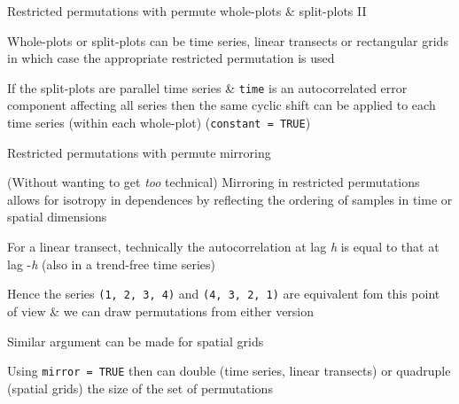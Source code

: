 \documentclass[10pt,ignorenonframetext,compress, aspectratio=169]{beamer}
\begin{document}
\begin{frame}{Restricted permutations with permute \textbar{}
whole-plots \& split-plots II}

Whole-plots or split-plots can be time series, linear transects or
rectangular grids in which case the appropriate restricted permutation
is used

If the split-plots are parallel time series \& \texttt{time} is an
autocorrelated error component affecting all series then the same cyclic
shift can be applied to each time series (within each whole-plot)
(\texttt{constant\ =\ TRUE})

\end{frame}

\begin{frame}{Restricted permutations with permute \textbar{} mirroring}

(Without wanting to get \emph{too} technical) Mirroring in restricted
permutations allows for isotropy in dependences by reflecting the
ordering of samples in time or spatial dimensions

For a linear transect, technically the autocorrelation at lag \emph{h}
is equal to that at lag -\emph{h} (also in a trend-free time series)

Hence the series \texttt{(1,\ 2,\ 3,\ 4)} and \texttt{(4,\ 3,\ 2,\ 1)}
are equivalent fom this point of view \& we can draw permutations from
either version

Similar argument can be made for spatial grids

Using \texttt{mirror\ =\ TRUE} then can double (time series, linear
transects) or quadruple (spatial grids) the size of the set of
permutations

\end{frame}
\end{document}
